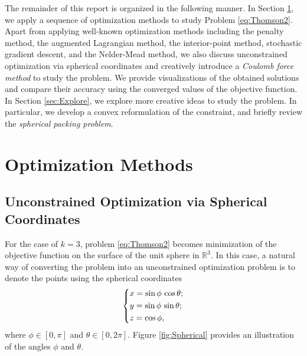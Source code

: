 \documentclass[11pt]{article}
\begin{document}
The remainder of this report is organized in the following manner.
In Section \ref{sec:OptMethods}, we apply a sequence of optimization methods to study Problem \eqref{eq:Thomson2}.
Apart from applying well-known optimization methods including the penalty method, the augmented Lagrangian method, the interior-point method, stochastic gradient descent, and the Nelder-Mead method, we also discuss unconstrained optimization via spherical coordinates and creatively introduce a \emph{Coulomb force method} to study the problem.
We provide visualizations of the obtained solutions and compare their accuracy using the converged values of the objective function.
In Section \ref{sec:Explore}, we explore more creative ideas to study the problem.
In particular, we develop a convex reformulation of the constraint, and briefly review the \emph{spherical packing problem}.



\section{Optimization Methods}\label{sec:OptMethods}


\subsection{Unconstrained Optimization via Spherical Coordinates}\label{sec:Sphere}

For the case of $k=3$, problem \eqref{eq:Thomson2} becomes minimization of the objective function on the surface of the unit sphere in $\mathbb{R}^3$.
In this case, a natural way of converting the problem into an unconstrained optimization problem is to denote the points using the spherical coordinates
\begin{equation*}
\begin{dcases}
x = \sin\phi\,\cos\theta; \\
y = \sin\phi\,\sin\theta; \\
z = \cos\phi,
\end{dcases}
\end{equation*}
where $\phi\in[0,\pi]$ and $\theta\in[0,2\pi]$. Figure \ref{fig:Spherical} provides an illustration of the angles $\phi$ and $\theta$. 
\end{document}

